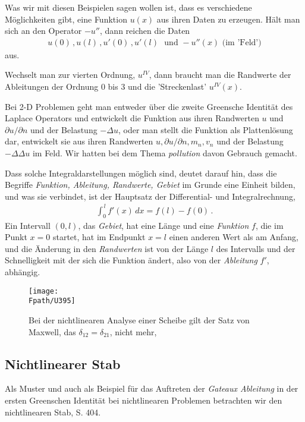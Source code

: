 {{{Was wir mit diesen Beispielen sagen wollen ist, dass es verschiedene M\"{o}glichkeiten gibt, eine Funktion $u(x)$ aus ihren Daten zu erzeugen. H\"{a}lt man sich an den Operator $-u''$, dann reichen die Daten
\begin{align}
u(0)\,, u(l)\,, u'(0)\,, u'(l) \,\,\,\,\text{und}\,\,-u''(x)\,\,\text{(im 'Feld')}
\end{align}
aus.

Wechselt man zur vierten Ordnung, $u^{IV}$, dann braucht man die Randwerte der Ableitungen der Ordnung 0 bis 3 und die 'Streckenlast' $u^{IV}(x)$.

Bei 2-D Problemen geht man entweder \"{u}ber die zweite Greensche Identit\"{a}t des Laplace Operators und entwickelt die Funktion aus ihren Randwerten $u$ und $\partial u / \partial n$ und der Belastung $-\Delta u$, oder man stellt die Funktion als Plattenl\"{o}sung dar, entwickelt sie aus ihren Randwerten $u, \partial u / \partial n, m_n, v_n$ und der Belastung $- \Delta \Delta u$ im Feld. Wir hatten bei dem Thema {\em pollution\/} davon Gebrauch gemacht.

Dass solche Integraldarstellungen m\"{o}glich sind, deutet darauf hin, dass die Begriffe {\em Funktion, Ableitung, Randwerte, Gebiet\/} im Grunde eine Einheit bilden, und was sie verbindet, ist  der Hauptsatz der Differential- und Integralrechnung,
\begin{align}
\int_0^{\,l} f'(x)\,dx = f(l) - f(0)\,.
\end{align}
Ein Intervall $(0,l)$, das {\em Gebiet\/}, hat eine L\"{a}nge und eine {\em Funktion\/} $f$, die im Punkt $x = 0$ startet, hat im Endpunkt $x = l$ einen anderen Wert als am Anfang, und die \"{A}nderung in den {\em Randwerten\/} ist von der L\"{a}nge $l$ des Intervalls und der Schnelligkeit mit der sich die Funktion \"{a}ndert, also von der {\em Ableitung\/} $f'$, abh\"{a}ngig.


\begin{figure}[tbp]
\if {} \sidecaption \fi
\texttt{[image: \\Fpath/U395]}
\caption{Bei der nichtlinearen Analyse einer Scheibe gilt der Satz von Maxwell, das $\delta_{12} = \delta_{21}$, nicht mehr, \cite{Ha5}}\label{U395}
\end{figure}%

{\textcolor{blau2}{\subsection{Nichtlinearer Stab}}}\label{Korrektur5}
Als Muster und auch als Beispiel f\"{u}r das Auftreten der {\em Gateaux Ableitung\/} in der ersten Greenschen Identit\"{a}t bei nichtlinearen Problemen betrachten wir den nichtlinearen Stab, \cite{Ha5} S. 404.

}}}
